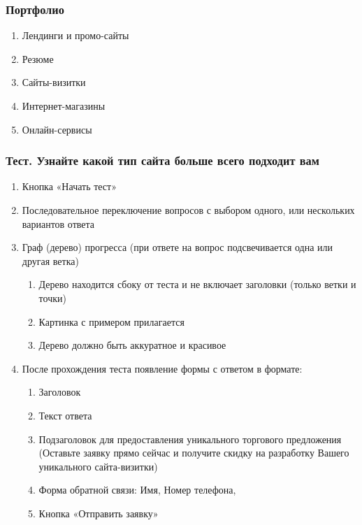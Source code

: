 \subsubsection{Портфолио}
\begin{enumerate}
  \item Лендинги и промо-сайты
  \item Резюме
  \item Сайты-визитки
  \item Интернет-магазины
  \item Онлайн-сервисы
\end{enumerate}

\subsubsection{Тест. Узнайте какой тип сайта больше всего подходит вам}
\begin{enumerate}
  \item Кнопка «Начать тест»
  \item Последовательное переключение вопросов с выбором одного, или нескольких вариантов ответа
  \item Граф (дерево) прогресса (при ответе на вопрос подсвечивается одна или другая ветка)
  \begin{enumerate}
    \item Дерево находится сбоку от теста и не включает заголовки (только ветки и точки)
    \item Картинка с примером прилагается
    \item Дерево должно быть аккуратное и красивое
  \end{enumerate}
  \item После прохождения теста появление формы с ответом в формате:
  \begin{enumerate}
    \item Заголовок
    \item Текст ответа
    \item Подзаголовок для предоставления уникального торгового предложения (Оставьте заявку прямо сейчас и получите скидку на разработку Вашего уникального сайта-визитки)
    \item Форма обратной связи: Имя, Номер телефона,
    \item Кнопка «Отправить заявку»
  \end{enumerate}
\end{enumerate}
